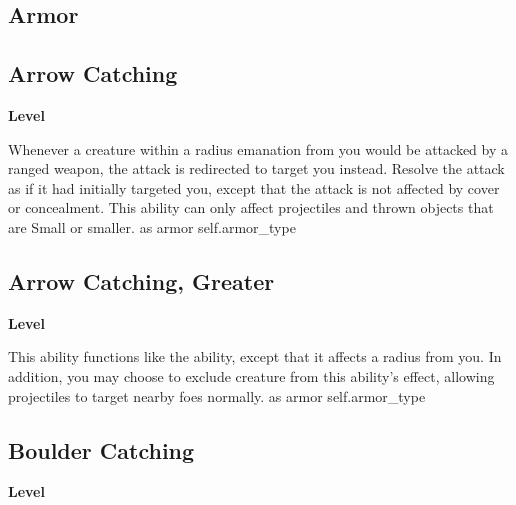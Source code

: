 \subsection{Armor}
\begin{multicols}{2}
\lowercase{\hypertarget{item:Arrow Catching}{}}\label{item:Arrow Catching}
\hypertarget{item:Arrow Catching}{\subsection{Arrow Catching}}
\columnbreak%
\begin{flushright}
\large\textbf{ Level}
\end{flushright}
\end{multicols}
\vspace{-1.5em}  %
Whenever a creature within a \areamed radius emanation from you would be attacked by a ranged weapon, the attack is redirected to target you instead.
Resolve the attack as if it had initially targeted you, except that the attack is not affected by cover or concealment.
This ability can only affect projectiles and thrown objects that are Small or smaller.
 
 as armor
 {self.armor_type}
\begin{multicols}{2}
\lowercase{\hypertarget{item:Arrow Catching, Greater}{}}\label{item:Arrow Catching, Greater}
\hypertarget{item:Arrow Catching, Greater}{\subsection{Arrow Catching, Greater}}
\columnbreak%
\begin{flushright}
\large\textbf{ Level}
\end{flushright}
\end{multicols}
\vspace{-1.5em}  %
This ability functions like the  ability, except that it affects a \arealarge radius from you.
In addition, you may choose to exclude creature from this ability's effect, allowing projectiles to target nearby foes normally.
 
 as armor
 {self.armor_type}
\begin{multicols}{2}
\lowercase{\hypertarget{item:Boulder Catching}{}}\label{item:Boulder Catching}
\hypertarget{item:Boulder Catching}{\subsection{Boulder Catching}}
\columnbreak%
\begin{flushright}
\large\textbf{ Level}
\end{flushright}
\end{multicols}

